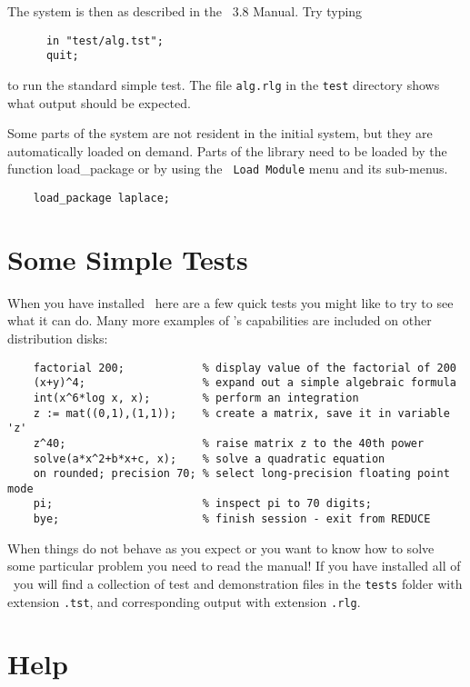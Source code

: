 \noindent The system is then as described in the \REDUCE\ 3.8 Manual.
Try typing
\begin{verbatim}
      in "test/alg.tst";
      quit;
\end{verbatim}
to run the standard simple test.  The file {\tt alg.rlg} in the
{\tt test} directory shows what output should be expected.

Some parts of the system are not resident in the initial system, but
they are automatically loaded on demand.  Parts of the library
need to be loaded by the function load\_package or by using the {\tt
Load Module} menu and its sub-menus.  

\begin{verbatim}
	load_package laplace;
\end{verbatim}

\section{Some Simple Tests}

When you have installed \REDUCE\ here are a few quick tests you might
like to try to see what it can do. Many more examples of \REDUCE's
capabilities are included on other distribution disks:

{\small
\begin{verbatim}
    factorial 200;            % display value of the factorial of 200
    (x+y)^4;                  % expand out a simple algebraic formula
    int(x^6*log x, x);        % perform an integration
    z := mat((0,1),(1,1));    % create a matrix, save it in variable 'z'
    z^40;                     % raise matrix z to the 40th power
    solve(a*x^2+b*x+c, x);    % solve a quadratic equation
    on rounded; precision 70; % select long-precision floating point mode
    pi;                       % inspect pi to 70 digits;
    bye;                      % finish session - exit from REDUCE
\end{verbatim}
}
When things do not behave as you expect or you want to know how to
solve some particular problem you need to read the manual!  If you
have installed all of \REDUCE\ you will find a collection of test and
demonstration files in the {\tt tests} folder with extension
{\tt .tst}, and corresponding output with extension {\tt .rlg}.

\section{Help}

